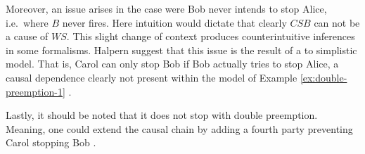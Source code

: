 \documentclass[11pt,a4paper]{book}
\theoremstyle{definition}
\theoremstyle{definition}
\theoremstyle{definition}
\theoremstyle{remark}
\begin{document}
Moreover, an issue arises in the case were Bob never intends to stop Alice, i.e.\ where $B$ never fires. 
Here intuition would dictate that clearly $CSB$ can not be a cause of $WS$. This slight change of context produces counterintuitive inferences in some formalisms.
Halpern suggest that this issue is the result of a to simplistic model. That is, Carol can only stop Bob if Bob actually tries to stop Alice, a causal dependence clearly not present within the model of Example \ref{ex:double-preemption-1} 
\parencite[p.~36]{halpern2016actual}. 


\begin{center}
\end{center}

%
% 
Lastly, it should be noted that it does not stop with double preemption. Meaning, one could extend the causal chain by adding a fourth party preventing Carol stopping Bob \parencite{denecker2018causal}.
\end{document}
